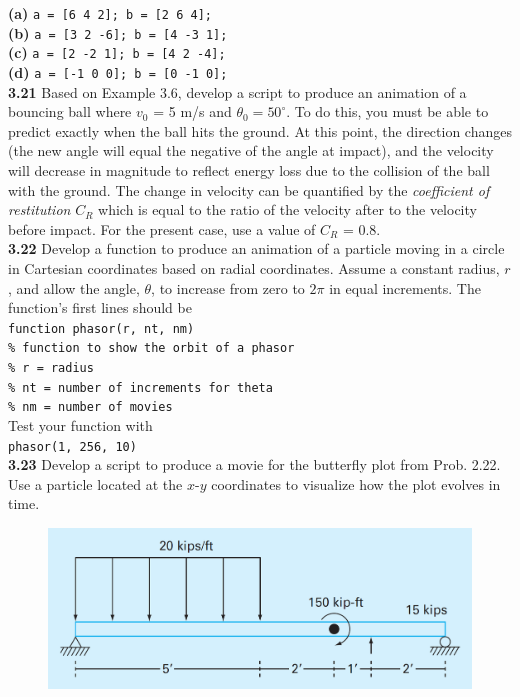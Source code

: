 \documentclass[../main.tex]{subfiles}
\begin{document}
\begin{multicols}{2}
    \noindent
    \textbf{(a)} \texttt{a = [6 4 2]; b = [2 6 4];}\\
    \textbf{(b)} \texttt{a = [3 2 -6]; b = [4 -3 1];}\\
    \textbf{(c)} \texttt{a = [2 -2 1]; b = [4 2 -4];}\\
    \textbf{(d)} \texttt{a = [-1 0 0]; b = [0 -1 0];}\\

    \noindent\textbf{3.21} Based on Example 3.6, develop a script to produce an
    animation of a bouncing ball where $v_0$ = 5 m/s and $\theta_0 = 50^{\circ}$.
    To do this, you must be able to predict exactly when the ball
    hits the ground. At this point, the direction changes (the new
    angle will equal the negative of the angle at impact), and the
    velocity will decrease in magnitude to reflect energy loss
    due to the collision of the ball with the ground. The change
    in velocity can be quantified by the \emph{coefficient of restitution}
    $C_R$ which is equal to the ratio of the velocity after to the velocity
    before impact. For the present case, use a value of
    $C_R$ = 0.8.\\

    \noindent\textbf{3.22} Develop a function to produce an animation of a particle
    moving in a circle in Cartesian coordinates based on radial
    coordinates. Assume a constant radius, $r$, and allow the
    angle, $\theta$, to increase from zero to $2\pi$ in equal increments.
    The function's first lines should be\\

    \texttt{function phasor(r, nt, nm)\\
    \indent \% function to show the orbit of
    \indent\hspace{40mm} a phasor\\
    \indent \% r = radius\\
    \indent \% nt = number of increments for 
    \indent\hspace{50mm}theta\\
    \indent \% nm = number of movies}\\

    \noindent Test your function with\\

    \texttt{phasor(1, 256, 10)}\\

    \noindent\textbf{3.23} Develop a script to produce a movie for the butterfly
    plot from Prob. 2.22. Use a particle located at the $x$-$y$ coordinates
    to visualize how the plot evolves in time.
\end{multicols}

\begin{figure}
    \centering
    \includegraphics[width = 0.7\linewidth]{./images/problem_3_3_9}
\end{figure}
\end{document}
